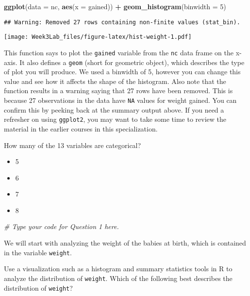\documentclass[]{article}
\newenvironment{Shaded}{\begin{snugshade}}{\end{snugshade}}
\newcommand{\KeywordTok}[1]{\textcolor[rgb]{0.13,0.29,0.53}{\textbf{#1}}}
\newcommand{\DataTypeTok}[1]{\textcolor[rgb]{0.13,0.29,0.53}{#1}}
\newcommand{\DecValTok}[1]{\textcolor[rgb]{0.00,0.00,0.81}{#1}}
\newcommand{\StringTok}[1]{\textcolor[rgb]{0.31,0.60,0.02}{#1}}
\newcommand{\CommentTok}[1]{\textcolor[rgb]{0.56,0.35,0.01}{\textit{#1}}}
\newcommand{\OperatorTok}[1]{\textcolor[rgb]{0.81,0.36,0.00}{\textbf{#1}}}
\newcommand{\NormalTok}[1]{#1}
\providecommand{\tightlist}{%
  \setlength{\itemsep}{0pt}\setlength{\parskip}{0pt}}
\begin{document}
\begin{Shaded}
\begin{Highlighting}[]
\KeywordTok{ggplot}\NormalTok{(}\DataTypeTok{data =}\NormalTok{ nc, }\KeywordTok{aes}\NormalTok{(}\DataTypeTok{x =}\NormalTok{ gained)) }\OperatorTok{+}
\StringTok{  }\KeywordTok{geom_histogram}\NormalTok{(}\DataTypeTok{binwidth =} \DecValTok{5}\NormalTok{)}
\end{Highlighting}
\end{Shaded}

\begin{verbatim}
## Warning: Removed 27 rows containing non-finite values (stat_bin).
\end{verbatim}

\texttt{[image: Week3Lab\_files/figure-latex/hist-weight-1.pdf]}

This function says to plot the \texttt{gained} variable from the
\texttt{nc} data frame on the x-axis. It also defines a \texttt{geom}
(short for geometric object), which describes the type of plot you will
produce. We used a binwidth of 5, however you can change this value and
see how it affects the shape of the histogram. Also note that the
function results in a warning saying that 27 rows have been removed.
This is because 27 observations in the data have \texttt{NA} values for
weight gained. You can confirm this by peeking back at the summary
output above. If you need a refresher on using \texttt{ggplot2}, you may
want to take some time to review the material in the earlier courses in
this specialization.

How many of the 13 variables are categorical?

\begin{itemize}
\tightlist
\item
  5
\item
  6
\item
  7
\item
  8
\end{itemize}

\begin{Shaded}
\begin{Highlighting}[]
\CommentTok{# Type your code for Question 1 here.}
\end{Highlighting}
\end{Shaded}

We will start with analyzing the weight of the babies at birth, which is
contained in the variable \texttt{weight}.

Use a visualization such as a histogram and summary statistics tools in
R to analyze the distribution of \texttt{weight}. Which of the following
best describes the distribution of \texttt{weight}?
\end{document}
